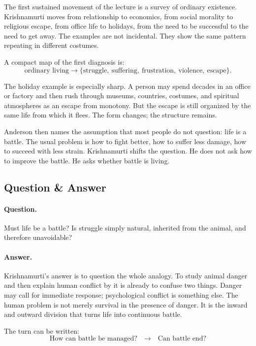 The first sustained movement of the lecture is a survey of ordinary existence. Krishnamurti moves from relationship to economics, from social morality to religious escape, from office life to holidays, from the need to be successful to the need to get away. The examples are not incidental. They show the same pattern repeating in different costumes.

A compact map of the first diagnosis is:
\begin{equation}
\text{ordinary living}
   \longrightarrow
\{\text{struggle},\ \text{suffering},\ \text{frustration},\ \text{violence},\ \text{escape}\}.
\end{equation}

The holiday example is especially sharp. A person may spend decades in an office or factory and then rush through museums, countries, costumes, and spiritual atmospheres as an escape from monotony. But the escape is still organized by the same life from which it flees. The form changes; the structure remains.

Anderson then names the assumption that most people do not question: life is a battle. The usual problem is how to fight better, how to suffer less damage, how to succeed with less strain. Krishnamurti shifts the question. He does not ask how to improve the battle. He asks whether battle is living.

\subsection{Question \& Answer}

\paragraph{Question.}
Must life be a battle? Is struggle simply natural, inherited from the animal, and therefore unavoidable?

\paragraph{Answer.}
Krishnamurti's answer is to question the whole analogy. To study animal danger and then explain human conflict by it is already to confuse two things. Danger may call for immediate response; psychological conflict is something else. The human problem is not merely survival in the presence of danger. It is the inward and outward division that turns life into continuous battle.

The turn can be written:
\begin{equation}
\text{How can battle be managed?}
   \quad \longrightarrow \quad
\text{Can battle end?}
\end{equation}

